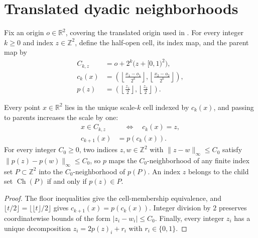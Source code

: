 \section{Translated dyadic neighborhoods}
\label{sec:area_law_dyadic_neighborhoods}

\begin{definition}
    \label{def:area_law_dyadic_cells}
    \leanok
    Fix an origin $o\in\mathbb R^2$, covering the translated origin used in
    \cite[Section~11]{OpenAI2026AreaLaw}. For every integer $k\ge0$ and index
    $z\in\mathbb Z^2$, define the half-open cell, its index map, and the
    parent map by
    \begin{align}
        C_{k,z} & =o+2^k\bigl(z+[0,1)^2\bigr),                         \\
        c_k(x)  & =\left(\left\lfloor\frac{x_1-o_1}{2^k}\right\rfloor,
        \left\lfloor\frac{x_2-o_2}{2^k}\right\rfloor\right),           \\
        p(z)    & =\left(\left\lfloor\frac{z_1}{2}\right\rfloor,
        \left\lfloor\frac{z_2}{2}\right\rfloor\right).
    \end{align}
\end{definition}

\begin{lemma}
    \label{thm:area_law_dyadic_indices}
    \leanok
    Every point $x\in\mathbb R^2$ lies in the unique scale-$k$ cell indexed by
    $c_k(x)$, and passing to parents increases the scale by one:
    \begin{align}
        x\in C_{k,z} & \quad\Longleftrightarrow\quad c_k(x)=z, \\
        c_{k+1}(x)   & =p(c_k(x)).
    \end{align}
    For every integer $C_0\ge0$, two indices $z,w\in\mathbb Z^2$ with
    $\|z-w\|_\infty\le C_0$ satisfy $\|p(z)-p(w)\|_\infty\le C_0$, so $p$ maps
    the $C_0$-neighborhood of any finite index set $P\subset\mathbb Z^2$ into
    the $C_0$-neighborhood of $p(P)$. An index $z$ belongs to the child set
    $\operatorname{Ch}(P)$ if and only if $p(z)\in P$.
\end{lemma}
\begin{proof}\leanok
    The floor inequalities give the cell-membership equivalence, and
    $\lfloor t/2\rfloor=\lfloor\lfloor t\rfloor/2\rfloor$ gives
    $c_{k+1}(x)=p(c_k(x))$. Integer division by $2$ preserves coordinatewise
    bounds of the form $|z_i-w_i|\le C_0$. Finally, every integer $z_i$ has a
    unique decomposition $z_i=2p(z)_i+r_i$ with $r_i\in\{0,1\}$.
\end{proof}

